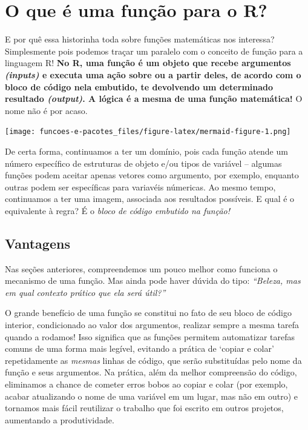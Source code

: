 \documentclass[
  letterpaper,
  DIV=11,
  numbers=noendperiod]{scrreprt}
\begin{document}
\section{\texorpdfstring{O que é uma função \textbf{para o
R}?}{O que é uma função para o R?}}\label{o-que-uxe9-uma-funuxe7uxe3o-para-o-r}

E por quê essa historinha toda sobre funções matemáticas nos interessa?
Simplesmente pois podemos traçar um paralelo com o conceito de função
para a linguagem R! \textbf{No R, uma função é um objeto que recebe
argumentos \emph{(inputs)} e executa uma ação sobre ou a partir deles,
de acordo com o bloco de código nela embutido, te devolvendo um
determinado resultado \emph{(output)}. A lógica é a mesma de uma função
matemática!} O nome não é por acaso.

\texttt{[image: funcoes-e-pacotes\_files/figure-latex/mermaid-figure-1.png]}

De certa forma, continuamos a ter um domínio, pois cada função atende um
número específico de estruturas de objeto e/ou tipos de variável --
algumas funções podem aceitar apenas vetores como argumento, por
exemplo, enquanto outras podem ser específicas para variavéis númericas.
Ao mesmo tempo, continuamos a ter uma imagem, associada aos resultados
possíveis. E qual é o equivalente à regra? É o \emph{bloco de código
embutido na função!}

\subsection{Vantagens}\label{vantagens}

Nas seções anteriores, compreendemos um pouco melhor como funciona o
mecanismo de uma função. Mas ainda pode haver dúvida do tipo:
\emph{``Beleza, mas em qual contexto prático que ela será útil?''}

O grande benefício de uma função se constitui no fato de seu bloco de
código interior, condicionado ao valor dos argumentos, realizar sempre a
mesma tarefa quando a rodamos! Isso significa que as funções permitem
automatizar tarefas comuns de uma forma mais legível, evitando a prática
de `copiar e colar' repetidamente as \emph{mesmas} linhas de código, que
serão substituídas pelo nome da função e seus argumentos. Na prática,
além da melhor compreensão do código, eliminamos a chance de cometer
erros bobos ao copiar e colar (por exemplo, acabar atualizando o nome de
uma variável em um lugar, mas não em outro) e tornamos mais fácil
reutilizar o trabalho que foi escrito em outros projetos, aumentando a
produtividade.
\end{document}
